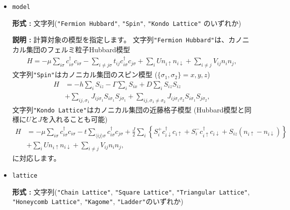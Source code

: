 \begin{itemize}

\item \verb|model|

  {\bf 形式 :} 文字列(\verb|"Fermion Hubbard"|, \verb|"Spin"|, \verb|"Kondo Lattice"|
  のいずれか)

{\bf 説明 :} 計算対象の模型を指定します。
文字列\verb|"Fermion Hubbard"|は、カノニカル集団のフェルミ粒子Hubbard模型
\begin{align}
H = - \mu \sum_{i \sigma} c^\dagger_{i \sigma} c_{i \sigma} 
- \sum_{i \neq j \sigma} t_{i j} c^\dagger_{i \sigma} c_{j \sigma} 
+ \sum_{i} U n_{i \uparrow} n_{i \downarrow}
+ \sum_{i \neq j} V_{i j} n_{i} n_{j},
\label{fml4_1_hubbard}
\end{align}
文字列\verb|"Spin"|はカノニカル集団のスピン模型 ($\{\sigma_1, \sigma_2\}={x, y, z}$)
\begin{align}
H &= -h \sum_{i} S_{i z} - \Gamma \sum_{i} S_{i x} + D \sum_{i} S_{i z} S_{i z}
\nonumber \\
&+ \sum_{i j, \sigma_1}J_{i j \sigma_1} S_{i \sigma_1} S_{j \sigma_1}+ \sum_{i j, \sigma_1 \neq \sigma_2} J_{i j \sigma_1 \sigma_2} S_{i \sigma_1} S_{j \sigma_2} ,
\label{fml4_1_spin}
\end{align}
文字列\verb|"Kondo Lattice"|はカノニカル集団の近藤格子模型
(Hubbard模型と同様に$U$と$J$を入れることも可能)
\begin{align}
H &= - \mu \sum_{i \sigma} c^\dagger_{i \sigma} c_{i \sigma} 
- t \sum_{\langle i j \rangle \sigma} c^\dagger_{i \sigma} c_{j \sigma} 
+ \frac{J}{2} \sum_{i} \left\{
S_{i}^{+} c_{i \downarrow}^\dagger c_{i \uparrow}
+ S_{i}^{-} c_{i \uparrow}^\dagger c_{i \downarrow}
+ S_{i z} (n_{i \uparrow} - n_{i \downarrow})\right\}
\nonumber \\
& +  \sum_{i} U n_{i \uparrow} n_{i \downarrow}
+ \sum_{i \neq j} V_{i j} n_{i} n_{j}
,
\label{fml4_1_kondo}
\end{align}
に対応します。

\item \verb|lattice|

{\bf 形式 :} 文字列(\verb|"Chain Lattice"|, \verb|"Square Lattice"|, 
\verb|"Triangular Lattice"|, \verb|"Honeycomb Lattice"|, \verb|"Kagome"|, \verb|"Ladder"|のいずれか)


\end{itemize}
